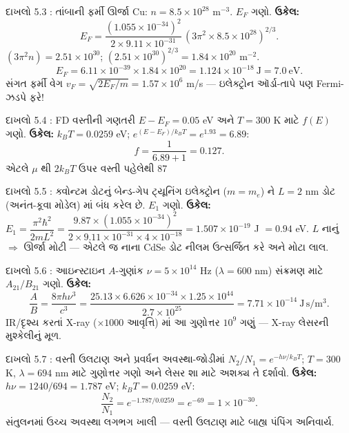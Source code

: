\begin{dahlo}{દાખલો 5.3 : તાંબાની ફર્મી ઊર્જા}
Cu: $n=8.5\times10^{28}$ m$^{-3}$. $E_F$ ગણો.
\tcblower
\textbf{ઉકેલ:}
\[
E_F=\frac{(1.055\times10^{-34})^{2}}{2\times9.11\times10^{-31}}\,(3\pi^{2}\times8.5\times10^{28})^{2/3}.
\]
$(3\pi^{2}n)=2.51\times10^{30}$; $(2.51\times10^{30})^{2/3}=1.84\times10^{20}$ m$^{-2}$.
\[
E_F=6.11\times10^{-39}\times1.84\times10^{20}=1.124\times10^{-18}\ \mathrm{J}=7.0\ \mathrm{eV}.
\]
સંગત ફર્મી વેગ $v_F=\sqrt{2E_F/m}=1.57\times10^{6}$ m/s — ઇલેક્ટ્રોન ઑર્ડા-તાપે પણ Fermi-ઝડપે ફરે!
\end{dahlo}

\begin{dahlo}{દાખલો 5.4 : FD વસ્તીની ગણતરી}
$E-E_F=0.05$ eV અને $T=300$ K માટે $f(E)$ ગણો.
\tcblower
\textbf{ઉકેલ:} $k_BT=0.0259$ eV; $e^{(E-E_F)/k_BT}=e^{1.93}=6.89$:
\[
f=\frac{1}{6.89+1}=0.127 .
\]
એટલે $\mu$ થી $2k_BT$ ઉપર વસ્તી પહેલેથી 87%
\end{dahlo}

\begin{dahlo}{દાખલો 5.5 : ક્વોન્ટમ ડોટનું બેન્ડ-ગેપ ટ્યૂનિંગ}
ઇલેક્ટ્રોન ($m=m_e$) ને $L=2$ nm ડોટ (અનંત-કૂવા મોડેલ) માં બંધ કરેલ છે. $E_1$ ગણો.
\tcblower
\textbf{ઉકેલ:} $E_1=\dfrac{\pi^{2}\hbar^{2}}{2mL^{2}}
=\dfrac{9.87\times(1.055\times10^{-34})^{2}}{2\times9.11\times10^{-31}\times4\times10^{-18}}
=1.507\times10^{-19}$ J $=0.94$ eV.
$L$ નાનું $\Rightarrow$ ઊર્જા મોટી — એટલે જ નાના CdSe ડોટ નીલમ ઉત્સર્જિત કરે અને મોટા લાલ.
\end{dahlo}

\begin{dahlo}{દાખલો 5.6 : આઇન્સ્ટાઇન $A$-ગુણાંક}
$\nu=5\times10^{14}$ Hz ($\lambda=600$ nm) સંક્રમણ માટે $A_{21}/B_{21}$ ગણો.
\tcblower
\textbf{ઉકેલ:}
\[
\frac{A}{B}=\frac{8\pi h\nu^{3}}{c^{3}}
=\frac{25.13\times6.626\times10^{-34}\times1.25\times10^{44}}{2.7\times10^{25}}
=7.71\times10^{-14}\ \mathrm{J\,s/m^{3}} .
\]
IR/દૃશ્ય કરતાં X-ray ($\times1000$ આવૃત્તિ) માં આ ગુણોત્તર $10^{9}$ ગણું — X-ray લેસરની મુશ્કેલીનું મૂળ.
\end{dahlo}

\begin{dahlo}{દાખલો 5.7 : વસ્તી ઉલટાણ અને પ્રવર્ધન}
અવસ્થા-જોડીમાં $N_2/N_1=e^{-h\nu/k_BT}$; $T=300$ K, $\lambda=694$ nm માટે ગુણોત્તર ગણો અને લેસર શા માટે અશક્ય તે દર્શાવો.
\tcblower
\textbf{ઉકેલ:} $h\nu=1240/694=1.787$ eV; $k_BT=0.0259$ eV:
\[
\frac{N_2}{N_1}=e^{-1.787/0.0259}=e^{-69}=1\times10^{-30}.
\]
સંતુલનમાં ઉચ્ચ અવસ્થા લગભગ ખાલી — વસ્તી ઉલટાણ માટે બાહ્ય પંપિંગ અનિવાર્ય.
\end{dahlo}

